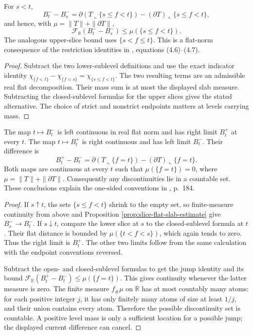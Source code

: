 \begin{proposition}\label{prop:slice-flat-slab-estimate}
For $s<t$,
\[
 B_t^- -B_s^-
 =\partial(T\llcorner\{s\leq f<t\})
       -(\partial T)\llcorner\{s\leq f<t\},
\]
and hence, with $\mu=\|T\|+\|\partial T\|$,
\[
 \mathcal F_{\mathbb R}(B_t^- -B_s^-)
 \leq\mu(\{s\leq f<t\}).
\]
The analogous upper-slice bound uses $\{s<f\leq t\}$. This is a flat-norm consequence of the restriction identities in \cite{Sim18}, equations (4.6)--(4.7).
\end{proposition}
\begin{proof}
Subtract the two lower-sublevel definitions and use the exact indicator identity $\chi_{\{f<t\}}-\chi_{\{f<s\}}=\chi_{\{s\leq f<t\}}$. The two resulting terms are an admissible real flat decomposition. Their mass sum is at most the displayed slab measure. Subtracting the closed-sublevel formulas for the upper slices gives the stated alternative. The choice of strict and nonstrict endpoints matters at levels carrying mass.
\end{proof}

\begin{theorem}\label{thm:slice-flat-one-sided}
The map $t\mapsto B_t^-$ is left continuous in real flat norm and has right limit $B_t^+$ at every $t$. The map $t\mapsto B_t^+$ is right continuous and has left limit $B_t^-$. Their difference is
\[
 B_t^+-B_t^-=
 \partial(T\llcorner\{f=t\})-(\partial T)\llcorner\{f=t\}.
\]
Both maps are continuous at every $t$ such that $\mu(\{f=t\})=0$, where $\mu=\|T\|+\|\partial T\|$. Consequently any discontinuities lie in a countable set. These conclusions explain the one-sided conventions in \cite{Sim18}, p.~184.
\end{theorem}
\begin{proof}
If $s\uparrow t$, the sets $\{s\leq f<t\}$ shrink to the empty set, so finite-measure continuity from above and Proposition \ref{prop:slice-flat-slab-estimate} give $B_s^-\to B_t^-$. If $s\downarrow t$, compare the lower slice at $s$ to the closed-sublevel formula at $t$. Their flat distance is bounded by $\mu(\{t<f<s\})$, which again tends to zero. Thus the right limit is $B_t^+$. The other two limits follow from the same calculation with the endpoint conventions reversed.

Subtract the open- and closed-sublevel formulas to get the jump identity and its bound $\mathcal F_{\mathbb R}(B_t^+-B_t^-)\leq\mu(\{f=t\})$. This gives continuity whenever the latter measure is zero. The finite measure $f_\#\mu$ on $\mathbb R$ has at most countably many atoms: for each positive integer $j$, it has only finitely many atoms of size at least $1/j$, and their union contains every atom. Therefore the possible discontinuity set is countable. A positive level mass is only a sufficient location for a possible jump; the displayed current difference can cancel.
\end{proof}

